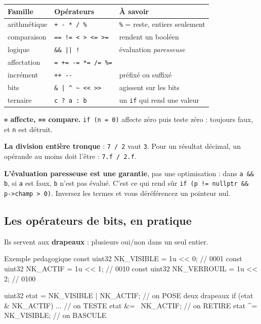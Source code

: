 \begin{center}
\begin{tabular}{@{}lll@{}}
\toprule
\textbf{Famille} & \textbf{Opérateurs} & \textbf{À savoir} \\
\midrule
arithmétique & \texttt{+ - * / \%} & \texttt{\%} = reste, entiers seulement \\
comparaison  & \texttt{== != < > <= >=} & rendent un booléen \\
logique      & \texttt{\&\& || !} & évaluation \emph{paresseuse} \\
affectation  & \texttt{= += -= *= /= \%=} & \\
incrément    & \texttt{++ -{}-} & préfixé ou suffixé \\
bits         & \texttt{\& | \^{} \~{} << >>} & agissent sur les bits \\
ternaire     & \texttt{c ? a : b} & un \texttt{if} qui rend une valeur \\
\bottomrule
\end{tabular}
\end{center}

\begin{nkpiege}
\textbf{\texttt{=} affecte, \texttt{==} compare.} \texttt{if (n = 0)} affecte
zéro puis teste zéro : toujours faux, et \texttt{n} est détruit.

\textbf{La division entière tronque} : \texttt{7 / 2} vaut \texttt{3}. Pour un
résultat décimal, un opérande au moins doit l'être : \texttt{7.f / 2.f}.

\textbf{L'évaluation paresseuse est une garantie}, pas une optimisation : dans
\texttt{a \&\& b}, si \texttt{a} est faux, \texttt{b} n'est pas évalué. C'est ce
qui rend sûr \texttt{if (p != nullptr \&\& p->champ > 0)}. Inversez les termes et
vous déréférencez un pointeur nul.
\end{nkpiege}

\subsection{Les opérateurs de bits, en pratique}

Ils servent aux \textbf{drapeaux} : plusieurs oui/non dans un seul entier.

\begin{nkcode}{Exemple pedagogique}
const uint32 NK_VISIBLE  = 1u << 0;   // 0001
const uint32 NK_ACTIF    = 1u << 1;   // 0010
const uint32 NK_VERROUIL = 1u << 2;   // 0100

uint32 etat = NK_VISIBLE | NK_ACTIF;  // on POSE deux drapeaux
if (etat & NK_ACTIF)      { ... }     // on TESTE
etat &= ~NK_ACTIF;                    // on RETIRE
etat ^= NK_VISIBLE;                   // on BASCULE
\end{nkcode}

